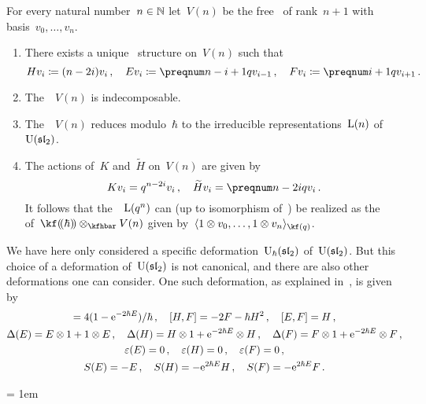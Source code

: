 \documentclass[a4paper, 11pt, oneside]{scrartcl}
\begin{document}
\begin{theorem}
  For every natural number~$n \in \mathbb{N}$ let~$V(n)$ be the free~\module{$\kfhbar$} of rank~$n+1$ with basis~$v_0, \dotsc, v_n$.
  \begin{enumerate}
    \item
      There exists a unique~ structure on~$V(n)$ such that
      \[
        H v_i \defined (n - 2i) v_i \,,
        \quad
        E v_i \defined \qnum{n - i + 1} v_{i-1} \,,
        \quad
        F v_i \defined \qnum{i+1} v_{i+1} \,.
      \]
    \item
      The~~$V(n)$ is indecomposable.
    \item
      The~~$V(n)$ reduces modulo~$\hbar$ to the irreducible representations~$\operatorname{L}(n)$ of~$\operatorname{U}(\mathfrak{sl}_2)$.
    \item
      The actions of~$K$ and~$\widetilde{H}$ on~$V(n)$ are given by
      \[
        K v_i
        =
        q^{n - 2i} v_i \,,
        \quad
        \widetilde{H} v_i
        =
        \qnum{n - 2i} v_i \,.
      \]
      It follows that the~~$\operatorname{L}(q^n)$ can (up to isomorphism of~) be realized as the~ of~$\lpower{\kf}{\hbar} \tensor_{\kfhbar} V(n)$ given by~$\gen{1 \tensor v_0, \dotsc, 1 \tensor v_n}_{\kf(q)}$.
  \end{enumerate}
\end{theorem}

\begin{remark}
  We have here only considered a specific deformation~$\operatorname{U}_{\hbar}(\mathfrak{sl}_2)$ of~$\operatorname{U}(\mathfrak{sl}_2)$.
  But this choice of a deformation of~$\operatorname{U}(\mathfrak{sl}_2)$ is not canonical, and there are also other deformations one can consider.
  One such deformation, as explained in~\cite[\S 6.4,~F]{guide_to_quantum_groups}, is given by
  \begin{gather*}
    [H, E] = 4 ( 1 - \e^{-2 \hbar E} ) / \hbar \,,
    \quad
    [H, F] = -2 F - \hbar H^2 \,,
    \quad
    [E, F] = H \,,
    \\
    \Delta(E) = E \tensor 1 + 1 \tensor E \,,
    \quad
    \Delta(H) = H \tensor 1 + \e^{-2 \hbar E} \tensor H \,,
    \quad
    \Delta(F) = F \tensor 1 + \e^{-2 \hbar E} \tensor F \,,
    \\
    \varepsilon(E) = 0 \,,
    \quad
    \varepsilon(H) = 0 \,,
    \quad
    \varepsilon(F) = 0 \,,
    \\
    S(E) = -E \,,
    \quad
    S(H) = - \e^{2 \hbar E} H \,,
    \quad
    S(F) = - \e^{2 \hbar E} F \,.
  \end{gather*}
\end{remark}





\emergencystretch = 1em
\printbibliography





\tableofcontents
\end{document}
